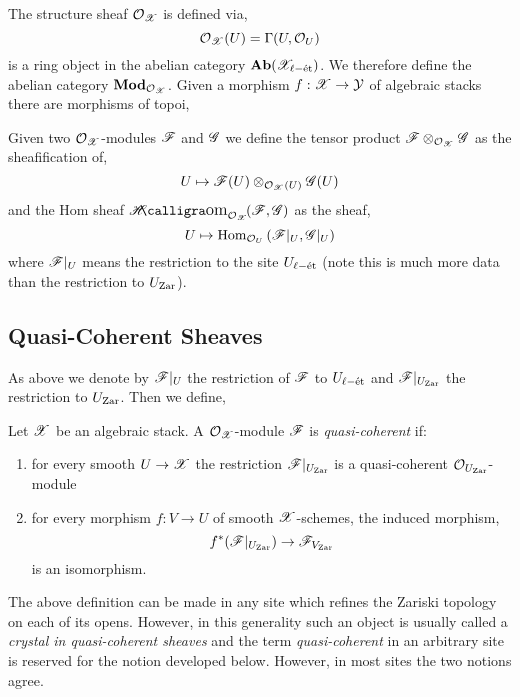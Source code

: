 \documentclass[12pt]{article}
\begin{document}
\begin{defn}
The structure sheaf $\mathcal{O}_{\mathscr{X}}$ is defined via,
\[ \mathcal{O}_{\mathscr{X}}(U) = \Gamma(U, \mathcal{O}_{U}) \]
is a ring object in the abelian category $\mathbf{Ab}(\mathscr{X}_{\ell-\text{\'{e}t}})$. We therefore define the abelian category $\mathbf{Mod}_{\mathcal{O}_{\mathscr{X}}}$. Given a morphism $f : \mathscr{X} \to \mathcal{Y}$ of algebraic stacks there are morphisms of topoi,
\begin{center}
\end{center}
Given two $\mathcal{O}_{\mathscr{X}}$-modules $\mathscr{F}$ and $\mathscr{G}$ we define the tensor product $\mathscr{F} \otimes_{\mathcal{O}_{\mathscr{X}}} \mathscr{G}$ as the sheafification of,
\[ U \mapsto \mathscr{F}(U) \otimes_{\mathcal{O}_{\mathscr{X}}(U)} \mathscr{G}(U) \]
and the Hom sheaf $\shHom{\struct{\X}}{\F}{\G}$ as the sheaf,
\[ U \mapsto \mathrm{Hom}_{\mathcal{O}_{U}} \left( \mathscr{F}|_U, \mathscr{G}|_U \right) \]
where $\mathscr{F}|_U$ means the restriction to the site $U_{\ell-\text{\'{e}t}}$ (note this is much more data than the restriction to $U_{\mathrm{Zar}}$). 
\end{defn}

\subsection{Quasi-Coherent Sheaves}

As above we denote by $\mathscr{F}|_U$ the restriction of $\mathscr{F}$ to $U_{\ell-\text{\'{e}t}}$ and $\mathscr{F}|_{U_{\mathrm{Zar}}}$ the restriction to $U_{\mathrm{Zar}}$. Then we define,

\begin{defn}
Let $\mathscr{X}$ be an algebraic stack. A $\mathcal{O}_{\mathscr{X}}$-module $\mathscr{F}$ is \textit{quasi-coherent} if:
\begin{enumerate}
\item for every smooth $U \to \mathscr{X}$ the restriction $\mathscr{F}|_{U_{\mathrm{Zar}}}$ is a quasi-coherent $\mathcal{O}_{U_{\mathrm{Zar}}}$-module
\item for every morphism $f : V \to U$ of smooth $\mathscr{X}$-schemes, the induced morphism,
\[ f^* (\mathscr{F}|_{U_{\mathrm{Zar}}}) \to \mathscr{F}_{V_{\mathrm{Zar}}} \]
is an isomorphism.
\end{enumerate}
\end{defn} 

\begin{rmk}
The above definition can be made in any site which refines the Zariski topology on each of its opens. However, in this generality such an object is usually called a \textit{crystal in quasi-coherent sheaves} and the term \textit{quasi-coherent} in an arbitrary site is reserved for the notion developed below. However, in most sites the two notions agree.
\end{rmk}
\end{document}
